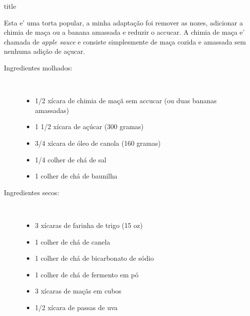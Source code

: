 \documentclass [11pt, letterpaper] {article}
\begin{document}
 {title}

Esta e' uma torta popular, a minha adapta\c{c}\~ao foi remover as nozes, adicionar a chimia de ma\c{c}a ou a banana amassada e reduzir o a{c}cucar. A chimia de ma\c{c}a e' chamada de {\it apple sauce} e consiste simplesmente de ma\c{c}a cozida e amassada sem nenhuma adi\c{c}\~ao de a\c{c}ucar.

\begin {description}
\item [Ingredientes molhados:] \ \newline
\begin {itemize}
\item 1/2 xícara de chimia de maçã sem ac{c}ucar (ou duas bananas amassadas)
\item 1 1/2 xícara de açúcar (300 gramas)
\item 3/4 xícara de óleo de canola (160 gramas)
\item 1/4 colher de chá de sal
\item 1 colher de chá de baunilha
\end {itemize}

\item [Ingredientes secos:] \ \newline
\begin {itemize}
\item 3 xícaras de farinha de trigo (15 oz)
\item 1 colher de chá de canela 
\item 1 colher de chá de bicarbonato de sódio
\item 1 colher de chá de fermento em pó
\item 3 xícaras de maçãs em cubos
\item 1/2 xícara de passas de uva
\end {itemize}


\end{description}
\end{document}

